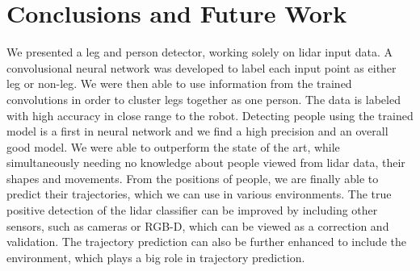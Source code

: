 \section{Conclusions and Future Work}

\label{sec:Conclusion}

We presented a leg and person detector, working solely on lidar input data. A convolusional neural network was developed to label each input point as either leg or non-leg. We were then able to use information from the trained convolutions in order to cluster legs together as one person. The data is labeled with high accuracy in close range to the robot. Detecting people using the trained model is a first in neural network and we find a high precision and an overall good model. We were able to outperform the state of the art, while simultaneously needing no knowledge about people viewed from lidar data, their shapes and movements. From the positions of people, we are finally able to predict their trajectories, which we can use in various environments. The true positive detection of the lidar classifier can be improved by including other sensors, such as cameras or RGB-D, which can be viewed as a correction and validation. The trajectory prediction can also be further enhanced to include the environment, which plays a big role in trajectory prediction.
